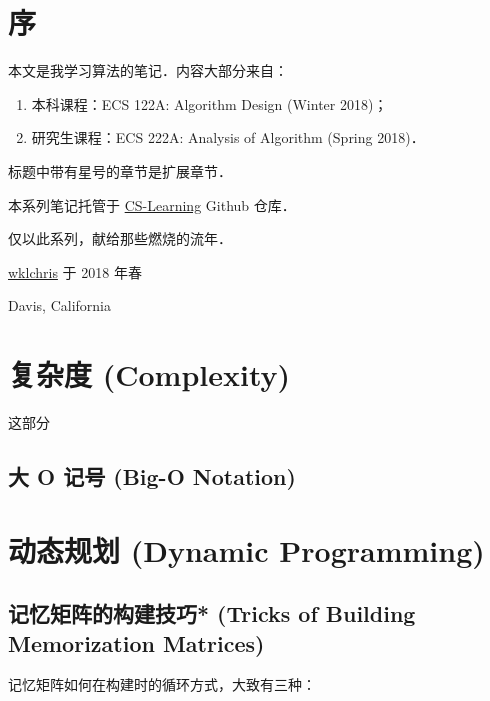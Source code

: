 \documentclass[a4paper, zihao=-4, linespread=1]{ctexrep}
\begin{document}
\chapter*{序}
本文是我学习算法的笔记．内容大部分来自：

\begin{enumerate}[topsep=1ex]
\item 本科课程：ECS 122A: Algorithm Design (Winter 2018)；
\item 研究生课程：ECS 222A: Analysis of Algorithm (Spring 2018)．
\end{enumerate}

标题中带有星号的章节是扩展章节．

\vspace*{2ex}本系列笔记托管于 \href{https://github.com/wklchris/CS-Learning}{CS-Learning} Github 仓库．

仅以此系列，献给那些燃烧的流年．

\vspace*{40pt}
\begin{flushright}
\href{email:wklchris@hotmail.com}{wklchris} 于 2018 年春

Davis, California
\end{flushright}

\tableofcontents

\chapter{复杂度 (Complexity)}
这部分

\section{大 O 记号 (Big-O Notation)}

\chapter{动态规划 (Dynamic Programming)}

\section{记忆矩阵的构建技巧* (Tricks of Building Memorization Matrices)}
记忆矩阵如何在构建时的循环方式，大致有三种：
\begin{center}
\resizebox{0.85\linewidth}{!}
  {}
\end{center}
\end{document}
